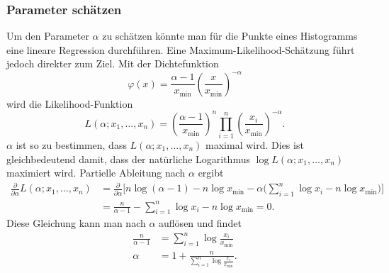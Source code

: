 \subsubsection{Parameter schätzen}
Um den Parameter $\alpha$ zu schätzen könnte man für die Punkte
eines Histogramms eine lineare Regression durchführen.
Eine Maximum-Likelihood-Schätzung führt jedoch direkter zum
Ziel.
Mit der Dichtefunktion
\[
\varphi(x)=\frac{\alpha-1}{x_{\min}}\left(\frac{x}{x_{\min}}\right)^{-\alpha}
\]
wird die Likelihood-Funktion
\[
L(\alpha;x_1,\dots,x_n)=
\left(\frac{\alpha-1}{x_{\min}}\right)^n
\prod_{i=1}^n
\left(\frac{x_i}{x_{\min}}\right)^{-\alpha}.
\]
$\alpha$ ist so zu bestimmen, dass $L(\alpha;x_1,\dots,x_n)$ maximal
wird.
Dies ist gleichbedeutend damit, dass der natürliche 
Logarithmus $\log L(\alpha;x_1,\dots,x_n)$ maximiert wird.
Partielle Ableitung nach $\alpha$ ergibt
\begin{align*}
\frac{\partial}{\partial \alpha}
L(\alpha;x_1,\dots,x_n)
&=
\frac{\partial}{\partial\alpha}
\biggl[
n\log(\alpha-1)-n\log x_{\min}
-\alpha\biggl( \sum_{i=1}^n\log x_i-n \log x_{\min}\biggr)
\biggr]
\\
&=
\frac{n}{\alpha-1}-\sum_{i=1}^n\log x_i-n\log x_{\min}=0.
\end{align*}
Diese Gleichung kann man nach $\alpha$ auflösen und findet
\begin{align*}
\frac{n}{\alpha-1}
&=
\sum_{i=1}^n \log\frac{x_i}{x_{\min}}
\\
\alpha&=1+\frac{n}{
\sum_{i=1}^n \log\frac{x_i}{x_{\min}}
}.
\end{align*}


